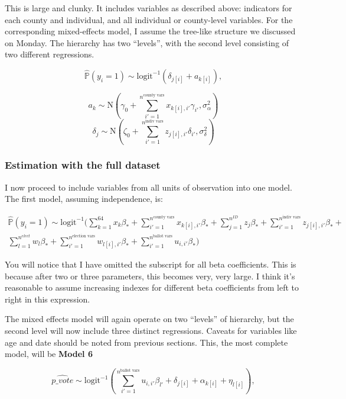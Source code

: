 \documentclass[12pt,twoside]{reedthesis}
\begin{document}
  This is large and clunky. It includes variables as described above:
  indicators for each county and individual, and all individual or
  county-level variables. For the corresponding mixed-effects model, I
  assume the tree-like structure we discussed on Monday. The hierarchy has
  two ``levels'', with the second level consisting of two different
  regressions.
  
  \[\hat{\mathbb{P}}(y_i = 1) \sim \text{logit}^{-1}(\delta_{j[i]} + a_{k[i]}), \]
  
  \[a_{k} \sim \text{N}(\gamma_0 + \sum_{i'=1}^{n^{\text{county vars}}}x_{k[i], i'}\gamma_{i'}, \sigma_{\alpha}^2)\]
  \[\delta_{j} \sim \text{N}(\zeta_0 + \sum_{i'=1}^{n^{\text{indiv vars}}}z_{j[i], i'}\delta_{i'}, \sigma_{\delta}^2)\]
  
  \subsubsection{Estimation with the full
  dataset}\label{estimation-with-the-full-dataset}
  
  I now proceed to include variables from all units of observation into
  one model. The first model, assuming independence, is:
  
  \begin{multline*}
  \hat{\mathbb{P}}(y_i = 1) \sim \text{logit}^{-1}(\sum_{k = 1}^{64}x_{k}\beta_{*} + \sum_{i'=1}^{n^{\text{county vars}}}x_{k[i], i'}\beta_{*} + \sum_{j = 1}^{n^{ID}}z_{j}\beta_{*} + \sum_{i'=1}^{n^{\text{indiv vars}}}z_{j[i], i'}\beta_{*} + \\
  \sum_{l = 1}^{n^{elect}}w_{l}\beta_{*} + \sum_{i'=1}^{n^{\text{election vars}}}w_{l[i], i'}\beta_{*} + \sum_{i' = 1}^{n^{\text{ballot vars}}}u_{i,i'}\beta_{*})
  \end{multline*}
  
  You will notice that I have omitted the subscript for all beta
  coefficients. This is because after two or three parameters, this
  becomes very, very large. I think it's reasonable to assume increasing
  indexes for different beta coefficients from left to right in this
  expression.
  
  The mixed effects model will again operate on two ``levels'' of
  hierarchy, but the second level will now include three distinct
  regressions. Caveats for variables like age and date should be noted
  from previous sections. This, the most complete model, will be
  \textbf{Model 6}
  
  \begin{equation} \tag{Model 6}
  \hat{p\_vote} \sim \text{logit}^{-1}(\sum_{i' = 1}^{n^{\text{ballot vars}}}u_{i,i'}\beta_{l'} +\delta_{j[i]} + \alpha_{k[i]} + \eta_{l[i]}),
  \end{equation}
  
\end{document}
